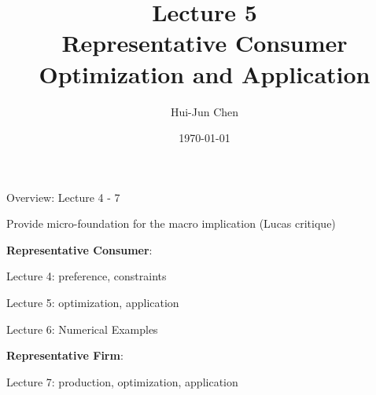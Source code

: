 \documentclass[11pt,aspectratio=169,usenames,dvipsnames]{beamer}
\title[Lecture 5]{Lecture 5 \\ Representative Consumer \\ Optimization and Application}
\author[Hui-Jun Chen]{Hui-Jun Chen}
\institute[NTHU]{National Tsing Hua University}
\date{\today}
\let\tempone\itemize
\let\temptwo\enditemize
\renewenvironment{itemize}{\tempone\addtolength{\itemsep}{\fill}}{\temptwo}
\begin{document}
\begin{frame}[plain]
    \titlepage
\end{frame}

\begin{frame}{Overview: Lecture 4 - 7}
\label{slide:Overview__Lecture_4_7}

\begin{center}
Provide \alert{micro-foundation} for the \alert{macro implication} (\alert{Lucas critique})
\end{center}

\begin{itemize}
    \item \textbf{Representative Consumer}:
    \begin{itemize}
        \item Lecture 4: \alert{preference}, \alert{constraints}
        \item Lecture 5: \alert{optimization}, \alert{application}
        \item Lecture 6: Numerical Examples
    \end{itemize}
    \item \textbf{Representative Firm}:
    \begin{itemize}
        \item Lecture 7: \alert{production}, \alert{optimization}, \alert{application}
    \end{itemize}
\end{itemize}
\end{frame}
\end{document}
